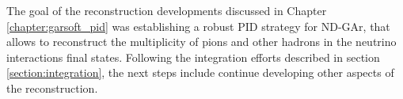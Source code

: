 \begin{comment}
Chapter \ref{chapter:garsoft_pid} reviews my work on the reconstruction for ND-GAr. In section \ref{section:dEdx} I try to establish the relation between the measured charge in the readout and the deposited energy from a stopping proton sample, using the residual range of the tracks. This calibration allows to compute the mean $\mathrm{d}E/\mathrm{d}x$ for the particles. I finish the section providing a parametrisation for how this depends on the momentum. The problem of the muon and pion separation is the topic of section \ref{section:muon_bdt}. I propose to use the information from the ECal to achieve this classification. In this section, I describe the features and the procedure I follow to train the classifier, showing its performance as a function of the particle momentum. In section \ref{section:tof} I explore the possibility of performing a ToF measurement with the ECal. With this, I achieve a separation between pions and protons in a momentum range beyond the reach of the HPgTPC alone. Section \ref{section:pi_decay} is devoted to the identification of charged particle decays inside the HPgTPC where the parent plus (charged) daughter system is reconstructed as a single track. I use the information from the track fit to construct a series of variables which can identify the tracks containing decays, as well as locate their position. I finish the Chapter introducing a new clustering algorithm for the ECal hits in section \ref{section:neutral}. It aims at having a one-to-one correspondence between particles and clusters, which will facilitate the reconstruction of neutral particles in the ECal.

The goal of these developments was establishing a robust PID strategy for ND-GAr, that allows to reconstruct the multiplicity of pions and other hadrons in the neutrino interactions final states. In section \ref{section:integration} I describe the status of the integration of the different additions to the reconstruction chain.
\end{comment}

The goal of the reconstruction developments discussed in Chapter \ref{chapter:garsoft_pid} was establishing a robust PID strategy for ND-GAr, that allows to reconstruct the multiplicity of pions and other hadrons in the neutrino interactions final states. Following the integration efforts described in section \ref{section:integration}, the next steps include continue developing other aspects of the reconstruction.

